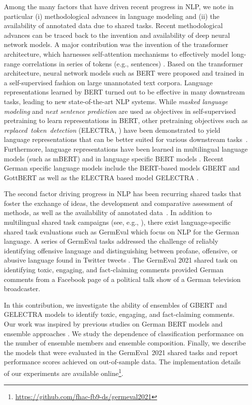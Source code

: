 \documentclass[11pt,a4paper]{article}
\begin{document}
Among the many factors that have driven recent progress in NLP, we note in particular (i) methodological advances in language modeling and (ii) the availability of annotated data due to shared tasks. Recent methodological advances can be traced back to the invention and availability of deep neural network models. A major contribution was the invention of the transformer architecture, which harnesses self-attention mechanisms to effectively model long-range correlations in series of tokens (e.g., sentences) \citep{Vaswani2017}. Based on the transformer architecture, neural network models such as BERT \citep{Devlin2018,Rogers2020} were proposed and trained in a self-supervised fashion on large unannotated text corpora. Language representations learned by BERT turned out to be effective in many downstream tasks, leading to new state-of-the-art NLP systems. While \emph{masked language modeling} and \emph{next sentence prediction} are used as objectives in self-supervised pretraining to learn representations in BERT, other pretraining objectives such as \mbox{\emph{replaced token detection}} (ELECTRA, \citet{Clark2020}) have been demonstrated to yield language representations that can be better suited for various downstream tasks~\citep{Xia2020}. Furthermore, language representations have been learned in multilingual language models (such as mBERT) and in language specific BERT models \citep{Nozza2020}. Recent German specific language models include the BERT-based models GBERT \citep{Chan2020} and GottBERT \citep{Scheible2021} as well as the ELECTRA based  model GELECTRA \citep{Chan2020}.

The second factor driving progress in NLP has been recurring shared tasks that foster the exchange of ideas, the development and comparative assessment of methods, as well as the availability of annotated data~\citep{Nissim2017}. In addition to multilingual shared task campaigns (see, e.g., \citet{Mandl2019,Basile2019}), there exist language-specific shared task evaluations such as GermEval which focus on NLP for the German language. A series of GermEval tasks addressed the challenge of reliably identifying offensive language \citep{Wiegand2018} and distinguishing between profane, offensive, or abusive language found in Twitter tweets \citep{Struss2019}. The GermEval 2021 shared task on identifying  toxic, engaging, and fact-claiming comments \citep{Risch2021} provided German comments from a Facebook page of a political talk show of a German television broadcaster.

In this contribution, we investigate the ability of ensembles of GBERT and GELECTRA models to identify toxic, engaging, and fact-claiming comments. Our work was inspired by previous studies on German BERT models \citep{Graf2019} and ensemble approaches \citep{Risch2018,Risch2020}. We study the dependence of classification performance on the number of ensemble members and ensemble composition. Finally, we describe the models that were evaluated in the \mbox{GermEval 2021} shared tasks and report performance scores achieved on out-of-sample data.
The implementation details of our experiments are available online\footnote{\url{https://github.com/fhac-fb9-ds/germeval2021}}.
\end{document}
